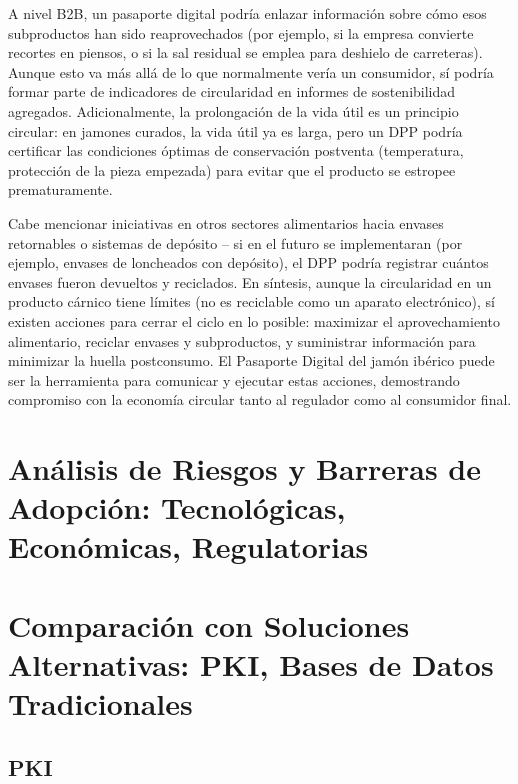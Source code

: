 A nivel B2B, un pasaporte digital podría enlazar información sobre cómo esos subproductos han sido reaprovechados (por ejemplo, si la empresa convierte recortes en piensos, o si la sal residual se emplea para deshielo de carreteras). Aunque esto va más allá de lo que normalmente vería un consumidor, sí podría formar parte de indicadores de circularidad en informes de sostenibilidad agregados. Adicionalmente, la prolongación de la vida útil es un principio circular: en jamones curados, la vida útil ya es larga, pero un DPP podría certificar las condiciones óptimas de conservación postventa (temperatura, protección de la pieza empezada) para evitar que el producto se estropee prematuramente.

Cabe mencionar iniciativas en otros sectores alimentarios hacia envases retornables o sistemas de depósito – si en el futuro se implementaran (por ejemplo, envases de loncheados con depósito), el DPP podría registrar cuántos envases fueron devueltos y reciclados. En síntesis, aunque la circularidad en un producto cárnico tiene límites (no es reciclable como un aparato electrónico), sí existen acciones para cerrar el ciclo en lo posible: maximizar el aprovechamiento alimentario, reciclar envases y subproductos, y suministrar información para minimizar la huella postconsumo. El Pasaporte Digital del jamón ibérico puede ser la herramienta para comunicar y ejecutar estas acciones, demostrando compromiso con la economía circular tanto al regulador como al consumidor final.

\section{Análisis de Riesgos y Barreras de Adopción: Tecnológicas, Económicas, Regulatorias}\label{sec:evaluacion-riesgos}

\section{Comparación con Soluciones Alternativas: PKI, Bases de Datos Tradicionales}\label{sec:evaluacion-comparacion}
\subsection{PKI}
